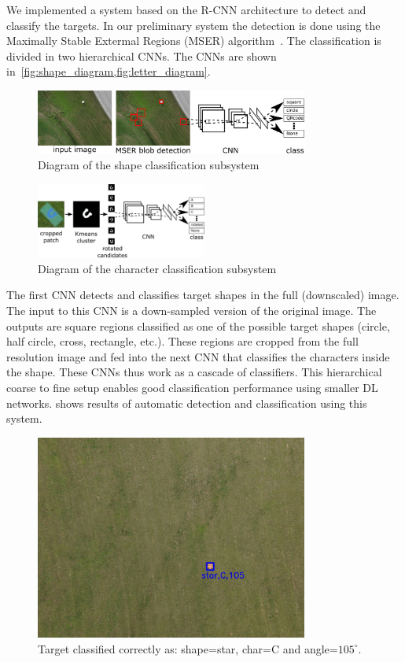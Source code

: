 \documentclass{article} %
\begin{document}
We implemented a system based on the R-CNN architecture to detect and classify
the targets. In our preliminary system the detection is done using the Maximally
Stable Extermal Regions (MSER) algorithm~\cite{Forssen2007}. The classification
is divided in two hierarchical CNNs. The CNNs are shown
in~\cref{fig:shape_diagram,fig:letter_diagram}.
\begin{figure}[h]
	\centering
	\includegraphics[width=0.8\textwidth]{diagram}
	\caption{Diagram of the shape classification subsystem}
	\label{fig:shape_diagram}
\end{figure}
\begin{figure}[h]
	\centering
	\includegraphics[width=0.5\textwidth]{letter_diagram}
	\caption{Diagram of the character classification subsystem}
	\label{fig:letter_diagram}
\end{figure}
The first CNN detects and classifies target shapes in the full (downscaled)
image. The input to this CNN is a down-sampled version of the original
image. The outputs are square regions classified as one of the possible target
shapes (circle, half circle, cross, rectangle, etc.). These regions are cropped
from the full resolution image and fed into the next CNN that classifies
the characters inside the shape. These CNNs thus work as a cascade of
classifiers. This hierarchical coarse to fine setup enables good classification
performance using smaller DL networks.  shows
results of automatic detection and classification using this system.
\begin{figure}[h]
	\centering
	\includegraphics[width=0.8\textwidth]{true_positive_correct_letter2}
	\caption{Target classified correctly as: shape=star, char=C and angle=$105^\circ$.}
	\label{fig:true_positive2}
\end{figure}
\end{document}
